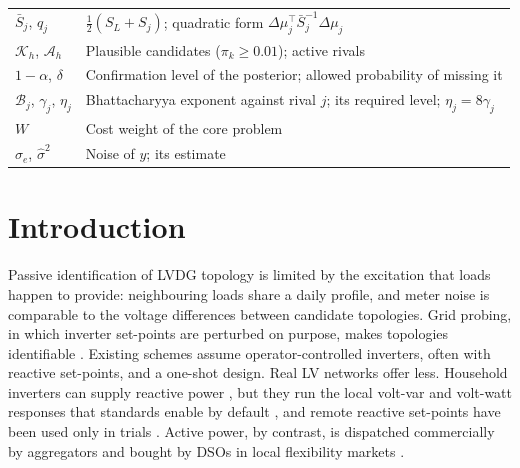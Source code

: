 \documentclass[journal,onecolumn,11pt]{IEEEtran}
\newcommand{\tp}{^{\top}}
\begin{document}
\begin{tabular}{@{}p{}p{}@{}}
$\bar S_j$, $q_j$ & $\tfrac12(S_L+S_j)$; quadratic form $\Delta\mu_j\tp\bar S_j^{-1}\Delta\mu_j$\\
$\mathcal K_h$, $\mathcal A_h$ & Plausible candidates ($\pi_k\ge 0.01$); active rivals\\
$1-\alpha$, $\delta$ & Confirmation level of the posterior; allowed probability of missing it\\
$\mathcal B_j$, $\gamma_j$, $\eta_j$ & Bhattacharyya exponent against rival $j$; its required level; $\eta_j=8\gamma_j$\\
$W$ & Cost weight of the core problem\\
$\sigma_e$, $\hat\sigma^2$ & Noise of $y$; its estimate\\
\bottomrule
\end{tabular}

\section{Introduction}
Passive identification of LVDG topology is limited by the excitation that loads happen to provide: neighbouring loads share a daily profile, and meter noise is comparable to the voltage differences between candidate topologies. Grid probing, in which inverter set-points are perturbed on purpose, makes topologies identifiable \cite{cavraro2019,cavraro2018,taheri2020,bhela2019}. Existing schemes assume operator-controlled inverters, often with reactive set-points, and a one-shot design. Real LV networks offer less. Household inverters can supply reactive power \cite{ieee1547}, but they run the local volt-var and volt-watt responses that standards enable by default \cite{asnzs4777,cec2021}, and remote reactive set-points have been used only in trials \cite{ausnet2019,ausgrid2023,iou2018}. Active power, by contrast, is dispatched commercially by aggregators and bought by DSOs in local flexibility markets \cite{jin2020}.
\end{document}
